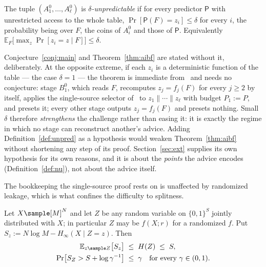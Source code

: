 \documentclass{conjura-conjecture}
\newcommand{\Prob}[1]{\Pr\!\left[#1\right]}
\newcommand{\Exp}{\mathbb{E}}
\newcommand{\bits}{\{0,1\}}
\newcommand{\Hmin}{H_{\infty}}
\begin{document}
\begin{definition}\label{def:unpred}
The tuple $(A^{0}_1,\dots,A^{0}_\ell)$ is \emph{$\delta$-unpredictable} if
for every predictor $\mathsf{P}$ with unrestricted access to the whole
table, $\Prob{\mathsf{P}(F) = z_i} \le \delta$ for every $i$, the
probability being over $F$, the coins of $A^{0}_i$ and those of
$\mathsf{P}$. Equivalently
$\Exp_{F}\bigl[\max_z \Prob{z_i = z \mid F}\bigr] \le \delta$.
\end{definition}

\begin{remark}
\label{rem:det}
Conjecture~\ref{conj:main} and Theorem~\ref{thm:aibf} are stated without
it, deliberately. At the opposite extreme, if each $z_i$ is a
deterministic function of the table --- the case $\delta = 1$ --- the
theorem is immediate from~\cite{CDGS} and needs no conjecture: stage
$B^{0}_1$, which reads $F$, recomputes $z_j = f_j(F)$ for every $j \ge 2$
by itself, applies the single-source selector of~\cite[Lem.~1]{CDGS} to
$z_1\|\cdots\|z_\ell$ with budget $P_1 := P$, and presets it; every other
stage outputs $z_j = f_j(F)$ and presets nothing. Small $\delta$ therefore
\emph{strengthens} the challenge rather than easing it: it is exactly the
regime in which no stage can reconstruct another's advice. Adding
Definition~\ref{def:unpred} as a hypothesis would weaken
Theorem~\ref{thm:aibf} without shortening any step of its proof.
Section~\ref{sec:ext} supplies its own hypothesis for its own reasons, and
it is about the \emph{points} the advice encodes
(Definition~\ref{def:nu}), not about the advice itself.
\end{remark}

The bookkeeping the single-source proof rests on is unaffected by
randomized leakage, which is what confines the difficulty to splitness.

\begin{lemma}\label{lem:randleak}
Let $X \sample [M]^{N}$ and let $Z$ be any random variable on $\bits^{S}$
jointly distributed with $X$; in particular $Z$ may be $f(X;r)$ for a
randomized $f$. Put $S_z := N\log M - \Hmin(X \mid Z = z)$. Then
\[
\begin{aligned}
  \Exp_{z \sample Z}\bigl[S_z\bigr] &\;\le\; H(Z) \;\le\; S , \\
  \Prob{S_Z > S + \log \gamma^{-1}} &\;\le\; \gamma
  \quad\text{for every } \gamma \in (0,1).
\end{aligned}
\]
\end{lemma}
\end{document}

